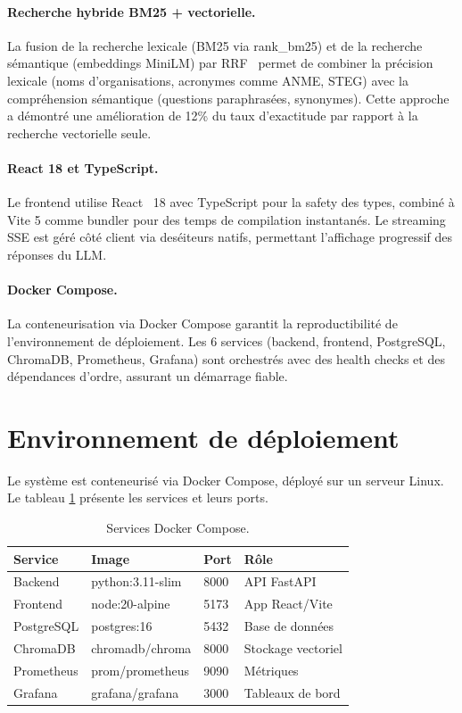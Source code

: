 \documentclass[12pt,a4paper,oneside]{report}
\begin{document}
\paragraph{Recherche hybride BM25 + vectorielle.} La fusion de la recherche lexicale (BM25 via rank\_bm25) et de la recherche s\'{e}mantique (embeddings MiniLM) par RRF~\cite{lewis2020rag} permet de combiner la pr\'{e}cision lexicale (noms d'organisations, acronymes comme ANME, STEG) avec la compr\'{e}hension s\'{e}mantique (questions paraphras\'{e}es, synonymes). Cette approche a d\'{e}montr\'{e} une am\'{e}lioration de 12\% du taux d'exactitude par rapport \`{a} la recherche vectorielle seule.

\paragraph{React 18 et TypeScript.} Le frontend utilise React~\cite{react} 18 avec TypeScript pour la safety des types, combin\'{e} \`{a} Vite 5 comme bundler pour des temps de compilation instantan\'{e}s. Le streaming SSE est g\'{e}r\'{e} c\^{o}t\'{e} client via des\'{e}iteurs natifs, permettant l'affichage progressif des r\'{e}ponses du LLM.

\paragraph{Docker Compose.} La conteneurisation via Docker Compose garantit la reproductibilit\'{e} de l'environnement de d\'{e}ploiement. Les 6 services (backend, frontend, PostgreSQL, ChromaDB, Prometheus, Grafana) sont orchestr\'{e}s avec des health checks et des d\'{e}pendances d'ordre, assurant un d\'{e}marrage fiable.

\section{Environnement de d\'{e}ploiement}

Le syst\`{e}me est conteneuris\'{e} via Docker Compose, d\'{e}ploy\'{e} sur un serveur Linux. Le tableau \ref{tab:docker} pr\'{e}sente les services et leurs ports.

\begin{table}[htbp]\centering
\begin{tabular}{@{}llll@{}}
\toprule
\textbf{Service} & \textbf{Image} & \textbf{Port} & \textbf{R\^{o}le} \\
\midrule
Backend & python:3.11-slim & 8000 & API FastAPI \\
Frontend & node:20-alpine & 5173 & App React/Vite \\
PostgreSQL & postgres:16 & 5432 & Base de donn\'{e}es \\
ChromaDB & chromadb/chroma & 8000 & Stockage vectoriel \\
Prometheus & prom/prometheus & 9090 & M\'{e}triques \\
Grafana & grafana/grafana & 3000 & Tableaux de bord \\
\bottomrule
\end{tabular}
\caption{Services Docker Compose.}
\label{tab:docker}
\end{table}
\end{document}
